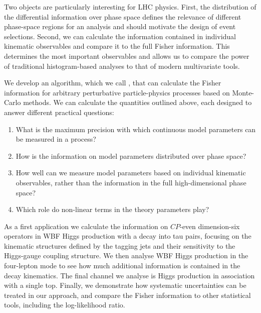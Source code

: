 Two objects are particularly interesting for LHC physics.  First, the
distribution of the differential information over phase space defines
the relevance of different phase-space regions for an analysis and
should motivate the design of event selections. Second, we can
calculate the information contained in individual kinematic
observables and compare it to the full Fisher information. This
determines the most important observables and allows us to compare the
power of traditional histogram-based analyses to that of modern
multivariate tools.

We develop an algorithm, which we call , that can
calculate the Fisher information for arbitrary perturbative
particle-physics processes based on Monte-Carlo methods. We can
calculate the quantities outlined above, each designed to answer
different practical questions:
%
\begin{enumerate}
\item What is the maximum precision
  with which continuous model parameters can be measured in a process?
\item How is the information
  on model parameters distributed over phase space?
\item How well can we measure model parameters based on individual
  kinematic observables, rather than the information in the full
  high-dimensional phase space?
\item Which role do non-linear terms in the
  theory parameters play?
\end{enumerate}

\newparagraph
%
As a first application we calculate the information on $CP$-even
dimension-six operators in WBF Higgs production with a decay into tau
pairs, focusing on the kinematic structures defined by the tagging
jets and their sensitivity to the Higgs-gauge coupling structure. We
then analyse WBF Higgs production in the four-lepton mode to see how
much additional information is contained in the decay kinematics. The
final channel we analyse is Higgs production in association with a
single top.
%
%
Finally, we demonstrate how systematic uncertainties can be
treated in our approach, and compare the Fisher information to other
statistical tools, including the log-likelihood ratio.

